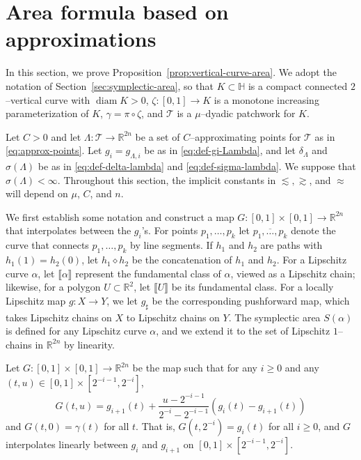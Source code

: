 \documentclass[12pt,reqno]{amsart}
\newcommand{\fcl}[1]{\llbracket{#1}\rrbracket}
\newcommand{\cT}{\mathcal{T}}
\newcommand{\HH}{\mathbb{H}}
\newcommand{\R}{\mathbb{R}}
\newcommand{\from}{\colon}
\theoremstyle{remark}
\newcommand{\0}{\mathbf{0}}
\renewcommand{\1}{\mathbf 1}
\DeclareMathOperator{\diam}{diam}
\begin{document}
\section{Area formula based on approximations}\label{sec:area-formula}

In this section, we prove Proposition~\ref{prop:vertical-curve-area}. We adopt the notation of Section~\ref{sec:symplectic-area}, so that $K\subset \HH$ is a compact connected $2$--vertical curve with $\diam K>0$, $\zeta\from [0,1]\to K$ is a monotone increasing parameterization of $K$, $\gamma = \pi\circ \zeta$, and $\cT$ is a $\mu$--dyadic patchwork for $K$.

Let $C>0$ and let $\Lambda\from \cT \to \R^{2n}$ be a set of $C$--approximating points for $\cT$ as in \eqref{eq:approx-points}. Let $g_i = g_{\Lambda,i}$ be as in \eqref{eq:def-gi-Lambda}, and let $\delta_\Lambda$ and $\sigma(\Lambda)$ be as in \eqref{eq:def-delta-lambda} and \eqref{eq:def-sigma-lambda}. We suppose that $\sigma(\Lambda)<\infty$. Throughout this section, the implicit constants in $\lesssim, \gtrsim$, and $\approx$ will depend on $\mu$, $C$, and $n$.

We first establish some notation and construct a map $G\from [0,1]\times [0,1] \to \R^{2n}$ that interpolates between the $g_i$'s.
For points $p_1,\dots, p_k$ let $\overline{p_1,\dots,p_k}$ denote the curve that connects $p_1,\dots,p_k$ by line segments. If $h_1$ and $h_2$ are paths with $h_1(1)=h_2(0)$, let $h_1\diamond h_2$ be the concatenation of $h_1$ and $h_2$. For a Lipschitz curve $\alpha$, let $\fcl{\alpha}$ represent the fundamental class of $\alpha$, viewed as a Lipschitz chain; likewise, for a polygon $U\subset \R^2$, let $\fcl{U}$ be its fundamental class. For a locally Lipschitz map $g:X\to Y$, we let $g_\sharp$ be the corresponding pushforward map, which takes Lipschitz chains on $X$ to Lipschitz chains on $Y$. The symplectic area $S(\alpha)$ is defined for any Lipschitz curve $\alpha$, and we extend it to the set of Lipschitz $1$--chains in $\R^{2n}$ by linearity.

Let $G\from [0,1]\times [0,1] \to \R^{2n}$ be the map such that for any $i\ge 0$ and any $(t, u) \in [0,1]\times [2^{-i-1}, 2^{-i}]$, 
\begin{equation}\label{eq:def-G}
  G(t, u) = g_{i+1}(t) + \frac{u - 2^{-i-1}}{2^{-i} - 2^{-i-1}} (g_i(t) - g_{i+1}(t))
\end{equation}
and $G(t,0)=\gamma(t)$ for all $t$.
That is, $G(t, 2^{-i}) = g_i(t)$ for all $i\ge 0$, and $G$ interpolates linearly between $g_i$ and $g_{i+1}$ on $[0,1]\times [2^{-i-1}, 2^{-i}]$.
\end{document}
